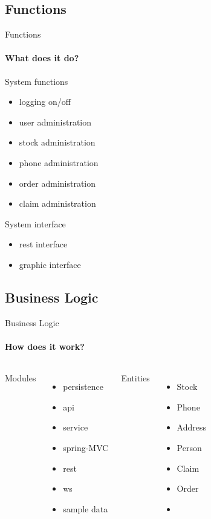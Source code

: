 \documentclass{beamer}
\begin{document}
\begin{darkframes}
	\subsection{Functions}
	\begin{frame}{Functions}
	\framesubtitle{What does it do?}%
        System functions
        \begin{itemize}
          \item logging on/off
          \item user administration
          \item stock administration
          \item phone administration
          \item order administration
          \item claim administration
        \end{itemize}
        System interface
        \begin{itemize}
          \item rest interface
          \item graphic interface
        \end{itemize}
    \end{frame}    
    
    \subsection{Business Logic}
	\begin{frame}{Business Logic}
      \framesubtitle{How does it work?}%
      \begin{columns}[onlytextwidth]
      Modules
        \begin{itemize}
          \item persistence
          \item api
          \item service
          \item spring-MVC
          \item rest
          \item ws
          \item sample data
        \end{itemize}
        Entities
          \begin{itemize}
            \item Stock
            \item Phone 
            \item Address
            \item Person
            \item Claim
            \item Order
            \item[] 
          \end{itemize}
      \end{columns}
    \end{frame}  
    

\end{darkframes}
\end{document}
